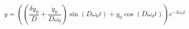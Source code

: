 \begin{equation}
y = \left(\left(\frac{\delta y_{0}}{D} + \frac{\dot{y}_{0}}{D \omega_{0}}\right) \operatorname{sin}\left(D \omega_{0} t\right) + y_{0} \operatorname{cos}\left(D \omega_{0} t\right)\right) e^{- \delta \omega_{0} t}
\end{equation}
